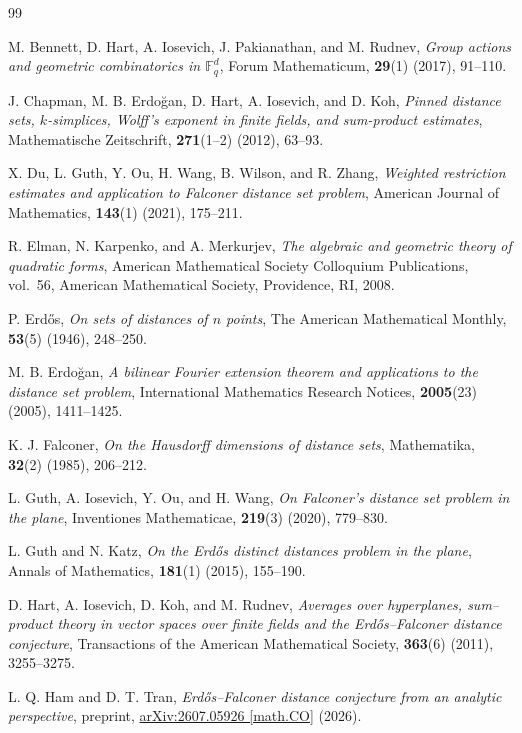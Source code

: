\documentclass[11pt]{article}
\newcommand{\F}{\mathbb F}
\begin{document}
\begin{thebibliography}{99}

M. Bennett, D. Hart, A. Iosevich, J. Pakianathan, and M. Rudnev,
\emph{Group actions and geometric combinatorics in $\F_q^d$},
Forum Mathematicum, \textbf{29}(1) (2017), 91--110.

J. Chapman, M. B. Erdo\u{g}an, D. Hart, A. Iosevich, and D. Koh,
\emph{Pinned distance sets, $k$-simplices, Wolff's exponent in finite
fields, and sum-product estimates},
Mathematische Zeitschrift, \textbf{271}(1--2) (2012), 63--93.

X. Du, L. Guth, Y. Ou, H. Wang, B. Wilson, and R. Zhang,
\emph{Weighted restriction estimates and application to Falconer distance
set problem},
American Journal of Mathematics, \textbf{143}(1) (2021), 175--211.

R. Elman, N. Karpenko, and A. Merkurjev,
\emph{The algebraic and geometric theory of quadratic forms},
American Mathematical Society Colloquium Publications, vol.~56,
American Mathematical Society, Providence, RI, 2008.

P. Erd\H{o}s,
\emph{On sets of distances of $n$ points},
The American Mathematical Monthly, \textbf{53}(5) (1946), 248--250.

M. B. Erdo\u{g}an,
\emph{A bilinear Fourier extension theorem and applications to the distance
set problem},
International Mathematics Research Notices, \textbf{2005}(23) (2005),
1411--1425.

K. J. Falconer,
\emph{On the Hausdorff dimensions of distance sets},
Mathematika, \textbf{32}(2) (1985), 206--212.

L. Guth, A. Iosevich, Y. Ou, and H. Wang,
\emph{On Falconer's distance set problem in the plane},
Inventiones Mathematicae, \textbf{219}(3) (2020), 779--830.

L. Guth and N. Katz,
\emph{On the Erd\H{o}s distinct distances problem in the plane},
Annals of Mathematics, \textbf{181}(1) (2015), 155--190.

D. Hart, A. Iosevich, D. Koh, and M. Rudnev, \textit{Averages over hyperplanes, sum--product theory in vector spaces over finite fields and the Erd\H{o}s--Falconer distance conjecture}, Transactions of the American Mathematical Society, \textbf{363}(6) (2011), 3255--3275.

L. Q. Ham and D. T. Tran,
\emph{Erd\H{o}s--Falconer distance conjecture from an analytic perspective},
preprint, \href{https://arxiv.org/abs/2607.05926}
{arXiv:2607.05926 [math.CO]} (2026).


\end{thebibliography}
\end{document}
